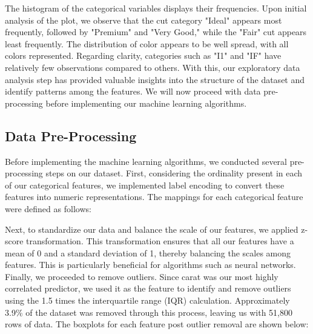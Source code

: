 \documentclass[conference]{IEEEtran}
\begin{document}
The histogram of the categorical variables displays their frequencies. Upon initial analysis of the plot, we observe that the cut category "Ideal" appears most frequently, followed by "Premium" and "Very Good," while the "Fair" cut appears least frequently. The distribution of color appears to be well spread, with all colors represented. Regarding clarity, categories such as "I1" and "IF" have relatively few observations compared to others. With this, our exploratory data analysis step has provided valuable insights into the structure of the dataset and identify patterns among the features. We will now proceed with data pre-processing before implementing our machine learning algorithms.

\subsection{Data Pre-Processing} 

Before implementing the machine learning algorithms, we conducted several pre-processing steps on our dataset. First, considering the ordinality present in each of our categorical features, we implemented label encoding to convert these features into numeric representations. The mappings for each categorical feature were defined as follows:

\begin{table}[htbp]
    \centering
    \caption{Label Encodings for Categorical Features}
    \label{tab:label_encodings}
\end{table}

Next, to standardize our data and balance the scale of our features, we applied z-score transformation. This transformation ensures that all our features have a mean of 0 and a standard deviation of 1, thereby balancing the scales among features. This is particularly beneficial for algorithms such as neural networks. Finally, we proceeded to remove outliers. Since carat was our most highly correlated predictor, we used it as the feature to identify and remove outliers using the 1.5 times the interquartile range (IQR) calculation. Approximately 3.9\% of the dataset was removed through this process, leaving us with 51,800 rows of data. The boxplots for each feature post outlier removal are shown below:
\end{document}

